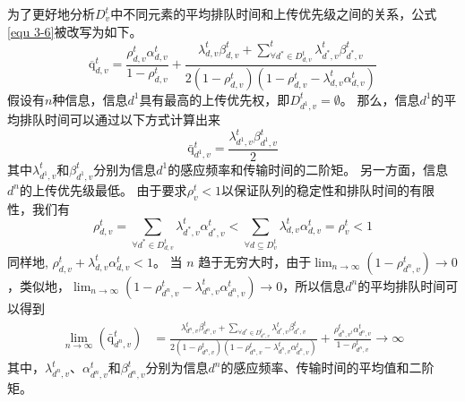 为了更好地分析$D_v^t$中不同元素的平均排队时间和上传优先级之间的关系，公式\ref{equ 3-6}被改写为如下。
\begin{equation}
\overline{\mathrm{q}}_{d, v}^t=\frac{\rho_{d, v}^t \alpha_{d, v}^t}{1-\rho_{d, v}^t}+\frac{\lambda_{d, v}^t \beta_{d, v}^t+\sum_{\forall d^* \in D_{d, v}^t}^t \lambda_{d^*, v}^t \beta_{d^*, v}^t}{2\left(1-\rho_{d, v}^t\right)\left(1-\rho_{d, v}^t-\lambda_{d, v}^t \alpha_{d, v}^t\right)}
\end{equation}
假设有$n$种信息，信息${d^1}$具有最高的上传优先权，即$D_{d^1, v}^t = \emptyset$。
那么，信息${d^1}$的平均排队时间可以通过以下方式计算出来
\begin{equation}
\operatorname{\bar{q}}_{d^{1}, v}^t=\frac{\lambda_{d^1, v}^t \beta_{d^1, v}^t}{2}
\end{equation}
其中$\lambda_{d^1, v}^t$和$\beta_{d^1, v}^t$分别为信息$d^1$的感应频率和传输时间的二阶矩。
另一方面，信息${d^n}$的上传优先级最低。
由于要求$\rho_v^t < 1$以保证队列的稳定性和排队时间的有限性，我们有
\begin{equation}
\rho_{d, v}^t=\sum_{\forall d^* \in D_{d, v}^t} \lambda_{d^*, v}^t \alpha_{d^*, v}^t<\sum_{\forall d \subseteq D_v^t} \lambda_{d, v}^t \alpha_{d, v}^t=\rho_v^t<1
\end{equation}
同样地, $\rho_{d, v}^t+\lambda_{d, v}^t \alpha_{d, v}^t<1$。
当 $n$ 趋于无穷大时，由于$\lim _{n \rightarrow \infty}(1-\rho_{d^n, v}^t) \rightarrow 0$，类似地，$\lim _{n \rightarrow \infty}(1-\rho_{d^n, v}^t-\lambda_{d^n, v}^t \alpha_{d^n, v}^t) \rightarrow 0$，所以信息${d^n}$的平均排队时间可以得到
\begin{equation}
\begin{aligned}
	\lim _{n \rightarrow \infty}\left(\mathrm{\bar{q}}_{d^n, v}^t\right)&=\frac{\lambda_{d^n, v}^t \beta_{d^n, v}^t+\sum_{\forall d^* \in D_{d^n, v}^t} \lambda_{d^*, v}^t \beta_{d^*, v}^t}{2\left(1-\rho_{d^n, v}^t\right)\left(1-\rho_{d^n, v}^t-\lambda_{d^n, v}^t \alpha_{d^n, v}^t\right)} + \frac{\rho_{d^n, v^t}^t \alpha_{d^n, v}^t}{1-\rho_{d^n, v}^t}\rightarrow \infty
\end{aligned}
\end{equation}
其中，$\lambda_{d^n, v}^t$、$\alpha_{d^n, v}^t$和$\beta_{d^n, v}^t$分别为信息$d^n$的感应频率、传输时间的平均值和二阶矩。



